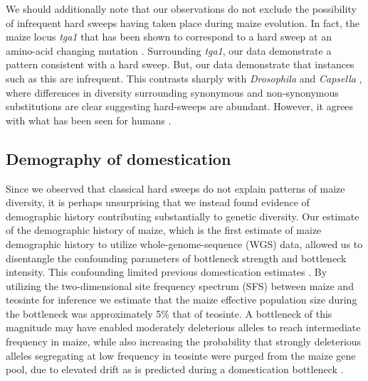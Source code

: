 \documentclass{pnastwo}
\begin{document}
\begin{article}
We should additionally note that our observations do not exclude the possibility of infrequent hard sweeps having taken place during maize evolution. In fact, the maize locus \emph{tga1} that has been shown to correspond to a hard sweep at an amino-acid changing mutation \cite{wang2015}. Surrounding \emph{tga1},  our data demonstrate a pattern consistent with a hard sweep. But, our data demonstrate that instances such as this are infrequent. This contrasts sharply with \emph{Drosophila} \cite{sattath2011} and \emph{Capsella} \cite{williamson2014}, where differences in diversity surrounding synonymous and non-synonymous substitutions are clear suggesting hard-sweeps are abundant. However, it agrees with what has been seen for humans \cite{hernandez2011}. 

\subsection{Demography of domestication}
Since we observed that classical hard sweeps do not explain patterns of maize diversity, it is perhaps unsurprising that we instead found evidence of demographic history contributing substantially to genetic diversity. Our estimate of the demographic history of maize, which is the first estimate of maize demographic history to utilize whole-genome-sequence (WGS) data, allowed us to disentangle the confounding parameters of bottleneck strength and bottleneck intensity. This confounding limited previous domestication estimates \cite{wright2005}. By utilizing the two-dimensional site frequency spectrum (SFS) between maize and teosinte for inference \cite{gutenkunst2009} we estimate that the maize effective population size during the bottleneck was approximately 5\% that of teosinte. A bottleneck of this magnitude may have enabled moderately deleterious alleles to reach intermediate frequency in maize, while also increasing the probability that strongly deleterious alleles segregating at low frequency in teosinte were purged from the maize gene pool, due to elevated drift as is predicted during a domestication bottleneck \cite{tajima1989}.


\end{article}
\end{document}
